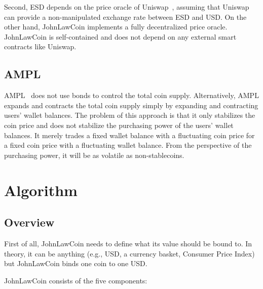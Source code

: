 \documentclass[dvipdfmx,a4paper]{article}
\begin{document}
Second, ESD depends on the price oracle of Uniswap~\cite{uniswap}, assuming that Uniswap can provide a non-manipulated exchange rate between ESD and USD. On the other hand, JohnLawCoin implements a fully decentralized price oracle. JohnLawCoin is self-contained and does not depend on any external smart contracts like Uniswap.

\subsection{AMPL}

AMPL~\cite{ampl} does not use bonds to control the total coin supply. Alternatively, AMPL expands and contracts the total coin supply simply by expanding and contracting users' wallet balances. The problem of this approach is that it only stabilizes the coin price and does not stabilize the purchasing power of the users' wallet balances. It merely trades a fixed wallet balance with a fluctuating coin price for a fixed coin price with a fluctuating wallet balance. From the perspective of the purchasing power, it will be as volatile as non-stablecoins.

\section{Algorithm}

\subsection{Overview}

First of all, JohnLawCoin needs to define what its value should be bound to. In theory, it can be anything (e.g., USD, a currency basket, Consumer Price Index) but JohnLawCoin binds one coin to one USD.

JohnLawCoin consists of the five components:
\end{document}
